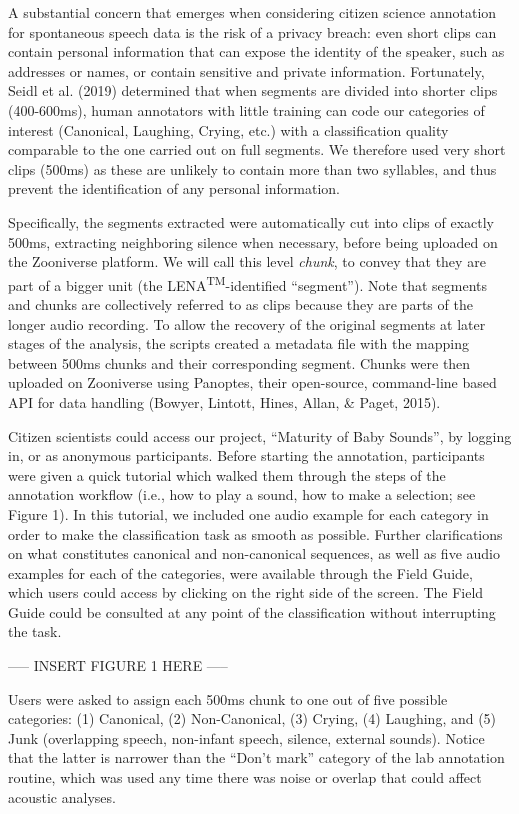 \documentclass[english,,man]{apa6}
\begin{document}
A substantial concern that emerges when considering citizen science annotation for spontaneous speech data is the risk of a privacy breach: even short clips can contain personal information that can expose the identity of the speaker, such as addresses or names, or contain sensitive and private information. Fortunately, Seidl et al. (2019) determined that when segments are divided into shorter clips (400-600ms), human annotators with little training can code our categories of interest (Canonical, Laughing, Crying, etc.) with a classification quality comparable to the one carried out on full segments. We therefore used very short clips (500ms) as these are unlikely to contain more than two syllables, and thus prevent the identification of any personal information.

Specifically, the segments extracted were automatically cut into clips of exactly 500ms, extracting neighboring silence when necessary, before being uploaded on the Zooniverse platform. We will call this level \emph{chunk}, to convey that they are part of a bigger unit (the LENA\textsuperscript{TM}-identified \enquote{segment}). Note that segments and chunks are collectively referred to as clips because they are parts of the longer audio recording. To allow the recovery of the original segments at later stages of the analysis, the scripts created a metadata file with the mapping between 500ms chunks and their corresponding segment. Chunks were then uploaded on Zooniverse using Panoptes, their open-source, command-line based API for data handling (Bowyer, Lintott, Hines, Allan, \& Paget, 2015).

Citizen scientists could access our project, \enquote{Maturity of Baby Sounds}, by logging in, or as anonymous participants. Before starting the annotation, participants were given a quick tutorial which walked them through the steps of the annotation workflow (i.e., how to play a sound, how to make a selection; see Figure 1). In this tutorial, we included one audio example for each category in order to make the classification task as smooth as possible. Further clarifications on what constitutes canonical and non-canonical sequences, as well as five audio examples for each of the categories, were available through the Field Guide, which users could access by clicking on the right side of the screen. The Field Guide could be consulted at any point of the classification without interrupting the task.

----- INSERT FIGURE 1 HERE -----

Users were asked to assign each 500ms chunk to one out of five possible categories: (1) Canonical, (2) Non-Canonical, (3) Crying, (4) Laughing, and (5) Junk (overlapping speech, non-infant speech, silence, external sounds). Notice that the latter is narrower than the \enquote{Don't mark} category of the lab annotation routine, which was used any time there was noise or overlap that could affect acoustic analyses.
\end{document}
